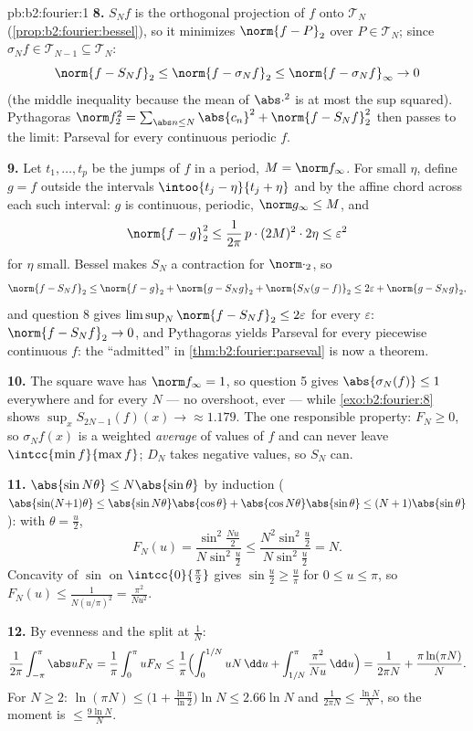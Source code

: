 \begin{solution}{pb:b2:fourier:1}
\textbf{8.} $S_Nf$ is the orthogonal projection of $f$ onto
$\mathcal T_N$ (\cref{prop:b2:fourier:bessel}), so it minimizes
$\norm{f - P}_2$ over $P \in \mathcal T_N$; since $\sigma_Nf
\in \mathcal T_{N-1} \subseteq \mathcal T_N$:
\[
\norm{f - S_Nf}_2 \leq \norm{f - \sigma_Nf}_2
\leq \norm{f - \sigma_Nf}_\infty \to 0
\]
(the middle inequality because the mean of $\abs\cdot^2$ is at
most the sup squared). Pythagoras $\norm f_2^2 = \sum_{\abs
n\leq N}\abs{c_n}^2 + \norm{f - S_Nf}_2^2$ then passes to the
limit: Parseval for every continuous periodic $f$.

\textbf{9.} Let $t_1, \dots, t_p$ be the jumps of $f$ in a
period, $M = \norm f_\infty$. For small $\eta$, define $g = f$
outside the intervals $\intoo{t_j - \eta}{t_j + \eta}$ and by
the affine chord across each such interval: $g$ is continuous,
periodic, $\norm g_\infty \leq M$, and
\[
\norm{f - g}_2^2 \leq \frac{1}{2\pi}\,p\cdot(2M)^2\cdot2\eta
\leq \varepsilon^2
\]
for $\eta$ small. Bessel makes $S_N$ a contraction for
$\norm\cdot_2$, so
\[
\norm{f - S_Nf}_2
\leq \norm{f - g}_2 + \norm{g - S_Ng}_2 + \norm{S_N(g -
f)}_2
\leq 2\varepsilon + \norm{g - S_Ng}_2 ,
\]
and question 8 gives $\limsup_N\norm{f - S_Nf}_2 \leq
2\varepsilon$ for every $\varepsilon$: $\norm{f - S_Nf}_2 \to
0$, and Pythagoras yields Parseval for every piecewise
continuous $f$: the ``admitted'' in
\cref{thm:b2:fourier:parseval} is now a theorem.

\textbf{10.} The square wave has $\norm f_\infty = 1$, so
question 5 gives $\abs{\sigma_N(f)} \leq 1$ everywhere and for
every $N$ --- no overshoot, ever --- while
\cref{exo:b2:fourier:8} shows $\sup_xS_{2N-1}(f)(x) \to
\approx 1.179$. The one responsible property: $F_N \geq 0$, so
$\sigma_Nf(x)$ is a weighted \emph{average} of values of $f$
and can never leave $\intcc{\min f}{\max f}$; $D_N$ takes
negative values, so $S_N$ can.

\textbf{11.} $\abs{\sin N\theta} \leq N\abs{\sin\theta}$ by
induction ($\abs{\sin(N{+}1)\theta} \leq
\abs{\sin N\theta}\abs{\cos\theta} +
\abs{\cos N\theta}\abs{\sin\theta} \leq
(N+1)\abs{\sin\theta}$): with $\theta = \frac u2$,
\[
F_N(u) = \frac{\sin^2\frac{Nu}2}{N\sin^2\frac u2}
\leq \frac{N^2\sin^2\frac u2}{N\sin^2\frac u2} = N .
\]
Concavity of $\sin$ on $\intcc{0}{\frac\pi2}$ gives
$\sin\frac u2 \geq \frac{u}{\pi}$ for $0 \leq u \leq \pi$, so
$F_N(u) \leq \frac{1}{N(u/\pi)^2} = \frac{\pi^2}{Nu^2}$.

\textbf{12.} By evenness and the split at $\frac1N$:
\[
\frac{1}{2\pi}\int_{-\pi}^{\pi}\abs uF_N
= \frac1\pi\int_0^\pi uF_N
\leq \frac1\pi\Bigl(\int_0^{1/N}uN\,\dd u +
\int_{1/N}^{\pi}\frac{\pi^2}{Nu}\,\dd u\Bigr)
= \frac{1}{2\pi N} + \frac{\pi\ln(\pi N)}{N} .
\]
For $N \geq 2$: $\ln(\pi N) \leq \bigl(1 +
\frac{\ln\pi}{\ln2}\bigr)\ln N \leq 2.66\ln N$ and
$\frac{1}{2\pi N} \leq \frac{\ln N}{N}$, so the moment is
$\leq \frac{9\ln N}{N}$.


\end{solution}
